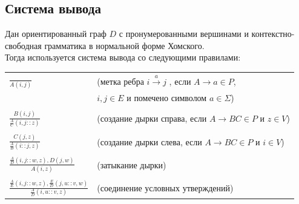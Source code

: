 \documentclass{spbau-diploma}
\begin{document}
\subsection {Система вывода} 
Дан ориентированный граф $D$ с пронумерованными вершинами и контекстно-свободная грамматика в нормальной форме Хомского.
\\Тогда используется система вывода со следующими правилами:
\begin{table}[ht]
  \centering
  \begin{tabular}[t]{l l}
   $\frac{}{A(i , j)}$ &(метка ребра $i \xrightarrow a j$ , если $A \rightarrow a \in P$,  
   \\ &   $i , j \in E$ и помечено символом $a \in \Sigma$)\\
    & \\
   $\frac{B(i , j)}{\frac{A}{C}(i , j :: z)}$  & (создание дырки справа, если  $A \rightarrow BC \in P$ и $z \in V$) \\
   & \\
   $\frac{C(j  , z)}{\frac{A}{B}(i :: j  , z)}$  & (создание дырки слева, если  $A \rightarrow BC \in P$ и $i \in V$) \\
   &\\
   $\frac{\frac{A}{D}(i , j :: w , z), D(j , w)}{A(i  , z)}$  & (затыкание дырки) \\
   &\\
   $\frac{\frac{A}{E}(i , j :: w  , z), \frac{E}{D}( j , u :: v , w)}{\frac{A}{D}(i, u :: v , z)}$  & (соединение условных утверждений) \\
   

\end{tabular}
\end{table}
\end{document}
